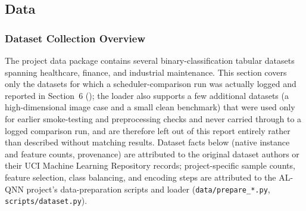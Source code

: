 \subsection{Data}

\subsubsection{Dataset Collection Overview}
The project data package contains several binary-classification tabular datasets spanning healthcare, finance, and industrial maintenance. This section covers only the datasets for which a scheduler-comparison run was actually logged and reported in Section~6 (); the loader also supports a few additional datasets (a high-dimensional image case and a small clean benchmark) that were used only for earlier smoke-testing and preprocessing checks and never carried through to a logged comparison run, and are therefore left out of this report entirely rather than described without matching results. Dataset facts below (native instance and feature counts, provenance) are attributed to the original dataset authors or their UCI Machine Learning Repository records; project-specific sample counts, feature selection, class balancing, and encoding steps are attributed to the AL-QNN project's data-preparation scripts and loader (\texttt{data/prepare\_*.py}, \texttt{scripts/dataset.py}).

